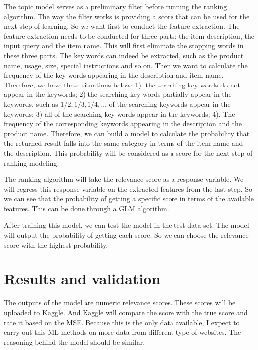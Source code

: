 \documentclass[twoside]{article}
\begin{document}
The topic model serves as a preliminary filter before running the ranking algorithm. The way the filter works is providing a score that can be used for the next step of learning. So we want first to conduct the feature extraction. The feature extraction needs to be conducted for three parts: the item description, the input query and the item name. This will first eliminate the stopping words in these three parts. The key words can indeed be extracted, such as the product name, usage, size, special instructions and so on. Then we want to calculate the frequency of the key words appearing in the description and item name. Therefore, we have these situations below: 1). the searching key words do not appear in the keywords; 2) the searching key words partially appear in the keywords, such as $1/2, 1/3, 1/4, \ldots$ of the searching keywords appear in the keywords; 3) all of the searching key words appear in the keywords; 4). The frequency of the corresponding keywords appearing in the description and the product name. Therefore, we can build a model to calculate the probability that the returned result falls into the same category in terms of the item name and the description. This probability will be considered as a score for the next step of ranking modeling. 

The ranking algorithm will take the relevance score as a response variable. We will regress this response variable on the extracted features from the last step. So we can see that the probability of getting a specific score in terms of the available features. This can be done through a GLM algorithm.

After training this model, we can test the model in the test data set. The model will output the probability of getting each score. So we can choose the relevance score with the highest probability.

\section{Results and validation}

The outputs of the model are numeric relevance scores. These scores will be uploaded to Kaggle. And Kaggle will compare the score with the true score and rate it based on the MSE. Because this is the only data available, I expect to carry out this ML methods on more data from different type of websites. The reasoning behind the model should be similar.



\end{document}
